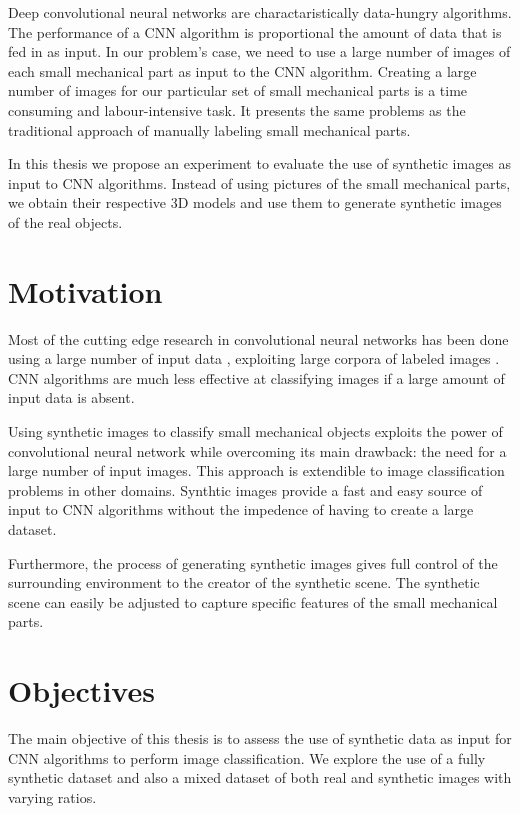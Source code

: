 \documentclass[a4paper,12pt,twoside]{report}
\begin{document}
Deep convolutional neural networks are charactaristically data-hungry algorithms. The performance of a CNN algorithm is proportional the amount of data that is fed in as input. In our problem's case, we need to use a large number of images of each small mechanical part as input to the CNN algorithm. Creating a large number of images for our particular set of small mechanical parts is a time consuming and labour-intensive task. It presents the same problems as the traditional approach of manually labeling small mechanical parts.

In this thesis we propose an experiment to evaluate the use of synthetic images as input to CNN algorithms. Instead of using pictures of the small mechanical parts, we obtain their respective 3D models and use them to generate synthetic images of the real objects.

\section{Motivation}

Most of the cutting edge research in convolutional neural networks has been done using a large number of input data \cite{krizhevsky2012imagenet} \cite{simonyan2014very} \cite{szegedy2015going} \cite{he2016deep}, exploiting large corpora of labeled images \cite{deng2009imagenet}. CNN algorithms are much less effective at classifying images if a large amount of input data is absent.

Using synthetic images to classify small mechanical objects exploits the power of convolutional neural network while overcoming its main drawback: the need for a large number of input images. This approach is extendible to image classification problems in other domains. Synthtic images provide a fast and easy source of input to CNN algorithms without the impedence of having to create a large dataset.

Furthermore, the process of generating synthetic images gives full control of the surrounding environment to the creator of the synthetic scene. The synthetic scene can easily be adjusted to capture specific features of the small mechanical parts.

\section{Objectives}

The main objective of this thesis is to assess the use of synthetic data as input for CNN algorithms to perform image classification. We explore the use of a fully synthetic dataset and also a mixed dataset of both real and synthetic images with varying ratios.
\end{document}
